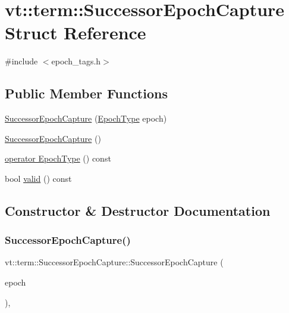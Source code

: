 \hypertarget{structvt_1_1term_1_1_successor_epoch_capture}{}\section{vt\+:\+:term\+:\+:Successor\+Epoch\+Capture Struct Reference}
\label{structvt_1_1term_1_1_successor_epoch_capture}


{\ttfamily \#include $<$epoch\+\_\+tags.\+h$>$}

\subsection*{Public Member Functions}
\begin{DoxyCompactItemize}
\item 
\hyperlink{structvt_1_1term_1_1_successor_epoch_capture_a381ce5ca6ccd31c0107afc6a8c811dae}{Successor\+Epoch\+Capture} (\hyperlink{namespacevt_a985a5adf291c34a3ca263b3378388236}{Epoch\+Type} epoch)
\item 
\hyperlink{structvt_1_1term_1_1_successor_epoch_capture_ada9a301cd6d1012f8a40916abd12a481}{Successor\+Epoch\+Capture} ()
\item 
\hyperlink{structvt_1_1term_1_1_successor_epoch_capture_a1e3fa8a36e11d5c11194ecc779c4d8a6}{operator Epoch\+Type} () const
\item 
bool \hyperlink{structvt_1_1term_1_1_successor_epoch_capture_ad21502111c09b6e08e9bd1200428f53e}{valid} () const
\end{DoxyCompactItemize}


\subsection{Constructor \& Destructor Documentation}
\mbox{\label{structvt_1_1term_1_1_successor_epoch_capture_a381ce5ca6ccd31c0107afc6a8c811dae}} 
\subsubsection{\texorpdfstring{Successor\+Epoch\+Capture()}{SuccessorEpochCapture()}\hspace{0.1cm}{\footnotesize\ttfamily [1/2]}}
{\footnotesize\ttfamily vt\+::term\+::\+Successor\+Epoch\+Capture\+::\+Successor\+Epoch\+Capture (\begin{DoxyParamCaption}\item[{\hyperlink{namespacevt_a985a5adf291c34a3ca263b3378388236}{Epoch\+Type}}]{epoch }\end{DoxyParamCaption})\hspace{0.3cm}{\ttfamily [inline]}, {\ttfamily [explicit]}}

